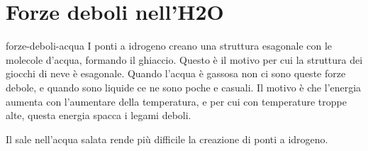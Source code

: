 \documentclass[preview]{standalone}
\begin{document}
\section{Forze deboli nell'H2O}

\begin{snippet}{forze-deboli-acqua}
    I ponti a idrogeno creano una struttura esagonale con le molecole d'acqua,
    formando il ghiaccio.
    Questo è il motivo per cui la struttura dei giocchi di neve è esagonale.
    Quando l'acqua è gassosa non ci sono queste forze debole, e quando sono
    liquide ce ne sono poche e casuali.
    Il motivo è che l'energia aumenta con l'aumentare della temperatura,
    e per cui con temperature troppe alte, questa energia spacca i legami deboli.

    Il sale nell'acqua salata rende più difficile la creazione di ponti a idrogeno.

\end{snippet}
\end{document}
